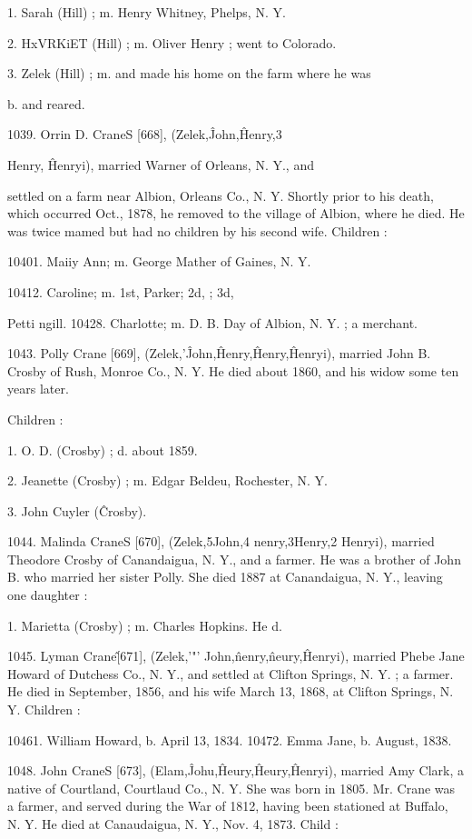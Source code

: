 1. Sarah (Hill) ; m. Henry Whitney, Phelps, N. Y. 

2. HxVRKiET (Hill) ; m. Oliver Henry ; went to Colorado. 

3. Zelek (Hill) ; m. and made his home on the farm where he was 

b. and reared. 

1039. Orrin D. CraneS [668], (Zelek,\^ John,\^ Henry,3 

Henry, \^ Henryi), married Warner of Orleans, N. Y., and 

settled on a farm near Albion, Orleans Co., N. Y. Shortly prior 
to his death, which occurred Oct., 1878, he removed to the 
village of Albion, where he died. He was twice mamed but had 
no children by his second wife. Children : 

10401. Maiiy Ann; m. George Mather of Gaines, N. Y. 

10412. Caroline; m. 1st,  Parker; 2d, ; 3d, 

Petti ngill. 
10428. Charlotte; m. D. B. Day of Albion, N. Y. ; a merchant. 

1043. Polly Crane [669], (Zelek,'\^ John,\^ Henry,\^ Henry,\^ 
Henryi), married John B. Crosby of Rush, Monroe Co., N. Y. 
He died about 1860, and his widow some ten years later. 

Children : 

1. O. D. (Crosby) ; d. about 1859. 

2. Jeanette (Crosby) ; m. Edgar Beldeu, Rochester, N. Y. 

3. John Cuyler (\^Crosby). 

1044. Malinda CraneS [670], (Zelek,5John,4 nenry,3Henry,2 
Henryi), married Theodore Crosby of Canandaigua, N. Y., and 
a farmer. He was a brother of John B. who married her sister 
Polly. She died 1887 at Canandaigua, N. Y., leaving one 
daughter : 

1. Marietta (Crosby) ; m. Charles Hopkins. He d. 

1045. Lyman Crane\^ [671], (Zelek,'"' John,\^ nenry,\^ neury,\^ 
Henryi), married Phebe Jane Howard of Dutchess Co., N. Y., 
and settled at Clifton Springs, N. Y. ; a farmer. He died in 
September, 1856, and his wife March 13, 1868, at Clifton Springs, 
N. Y. Children : 

10461. William Howard, b. April 13, 1834. 
10472. Emma Jane, b. August, 1838. 




1048. John CraneS [673], (Elam,\^ Johu,\^ Heury,\^ Heury,\^ 
Henryi), married Amy Clark, a native of Courtland, Courtlaud 
Co., N. Y. She was born in 1805. Mr. Crane was a farmer, 
and served during the War of 1812, having been stationed at 
Buffalo, N. Y. He died at Canaudaigua, N. Y., Nov. 4, 1873. 
Child : 

